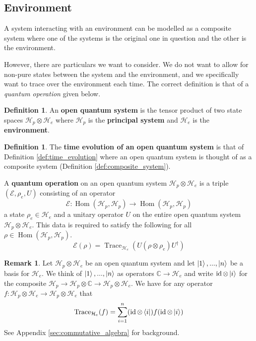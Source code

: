\documentclass[12pt]{article}
\theoremstyle{plain}
\theoremstyle{definition}
\newtheorem{defn}[thm]{Definition} %
\newtheorem{remark}[thm]{Remark}
\newcommand{\bb}[1]{\mathbb{#1}}
\newcommand{\call}[1]{\mathcal{#1}}
\newcommand{\lto}{\longrightarrow}
\begin{document}
	\subsection{Environment}
	A system interacting with an environment can be modelled as a composite system where one of the systems is the original one in question and the other is the environment.
	
	However, there are particulars we want to consider. We do not want to allow for non-pure states between the system and the environment, and we specifically want to trace over the environment each time. The correct definition is that of a \emph{quantum operation} given below.
	
	\begin{defn}
		An \textbf{open quantum system} is the tensor product of two state spaces $\call{H}_p \otimes \call{H}_e$ where $\call{H}_p$ is the \textbf{principal system} and $\call{H}_e$ is the \textbf{environment}.
	\end{defn}
	\begin{defn}\label{def:quantum_operation_partial_trace}
		The \textbf{time evolution of an open quantum system} is that of Definition \ref{def:time_evolution} where an open quantum system is thought of as a composite system (Definition \ref{def:composite_system}).
		
		A \textbf{quantum operation} on an open quantum system $\call{H}_p \otimes \call{H}_e$ is a triple $(\call{E}, \rho_e, U)$ consisting of an operator
		\begin{equation}
			\call{E}: \operatorname{Hom}(\call{H}_p, \call{H}_p) \lto \operatorname{Hom}(\call{H}_p, \call{H}_p)
			\end{equation}
		a state $\rho_e \in \call{H}_e$ and a unitary operator $U$ on the entire open quantum system $\call{H}_p\otimes \call{H}_e$. This data is required to satisfy the following for all $\rho \in \operatorname{Hom}(\call{H}_p, \call{H}_p)$.
		\begin{equation}\label{eq:quant_op_general_form}
			\call{E}(\rho) = \operatorname{Trace}_{\call{H}_e}(U (\rho \otimes \rho_e) U^\dagger)
		\end{equation}
	\end{defn}
	\begin{remark}\label{rmk:operator_sum_derivation}
		Let $\call{H}_p \otimes \call{H}_e$ be an open quantum system and let $\ket{1},...,\ket{n}$ be a basis for $\call{H}_e$. We think of $\ket{1},...,\ket{n}$ as operators $\bb{C} \lto \call{H}_e$ and write $\operatorname{id} \otimes \ket{i}$ for the composite $\call{H}_p \lto \call{H}_p \otimes \bb{C} \lto \call{H}_p \otimes \call{H}_e$. We have for any operator $f: \call{H}_p \otimes \call{H}_e \lto \call{H}_p \otimes \call{H}_e$ that
		\begin{equation}\label{eq:partial_trace_exp_form}
			\operatorname{Trace}_{\call{H}_e}(f) = \sum_{i = 1}^n (\operatorname{id} \otimes \bra{i})f(\operatorname{id} \otimes \ket{i})
		\end{equation}
		See Appendix \ref{sec:commutative_algebra} for background.
	\end{remark}
\end{document}
